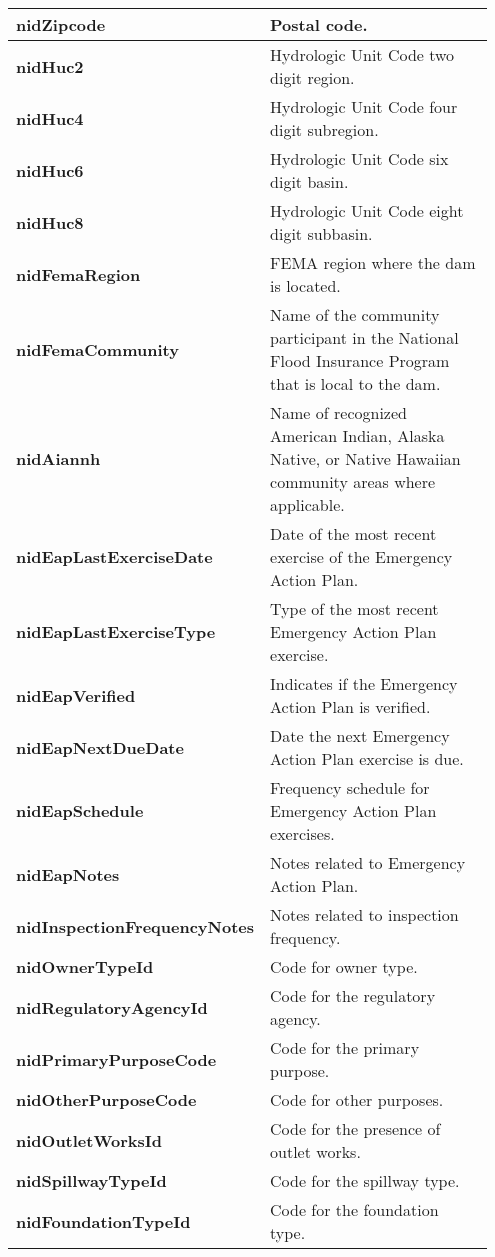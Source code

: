\documentclass{article}
\begin{document}
\begin{longtable}{p{0.35\linewidth} p{0.6\linewidth}}
\textbf{nidZipcode} & Postal code. \\\hline
\textbf{nidHuc2} & Hydrologic Unit Code two digit region. \\\hline
\textbf{nidHuc4} & Hydrologic Unit Code four digit subregion. \\\hline
\textbf{nidHuc6} & Hydrologic Unit Code six digit basin. \\\hline
\textbf{nidHuc8} & Hydrologic Unit Code eight digit subbasin. \\\hline
\textbf{nidFemaRegion} & FEMA region where the dam is located. \\\hline
\textbf{nidFemaCommunity} & Name of the community participant in the National Flood Insurance Program that is local to the dam. \\\hline
\textbf{nidAiannh} & Name of recognized American Indian, Alaska Native, or Native Hawaiian community areas where applicable. \\\hline
\textbf{nidEapLastExerciseDate} & Date of the most recent exercise of the Emergency Action Plan. \\\hline
\textbf{nidEapLastExerciseType} & Type of the most recent Emergency Action Plan exercise. \\\hline
\textbf{nidEapVerified} & Indicates if the Emergency Action Plan is verified. \\\hline
\textbf{nidEapNextDueDate} & Date the next Emergency Action Plan exercise is due. \\\hline
\textbf{nidEapSchedule} & Frequency schedule for Emergency Action Plan exercises. \\\hline
\textbf{nidEapNotes} & Notes related to Emergency Action Plan. \\\hline
\textbf{nidInspectionFrequencyNotes} & Notes related to inspection frequency. \\\hline
\textbf{nidOwnerTypeId} & Code for owner type. \\\hline
\textbf{nidRegulatoryAgencyId} & Code for the regulatory agency. \\\hline
\textbf{nidPrimaryPurposeCode} & Code for the primary purpose. \\\hline
\textbf{nidOtherPurposeCode} & Code for other purposes. \\\hline
\textbf{nidOutletWorksId} & Code for the presence of outlet works. \\\hline
\textbf{nidSpillwayTypeId} & Code for the spillway type. \\\hline
\textbf{nidFoundationTypeId} & Code for the foundation type. \\\hline

\end{longtable}
\end{document}
